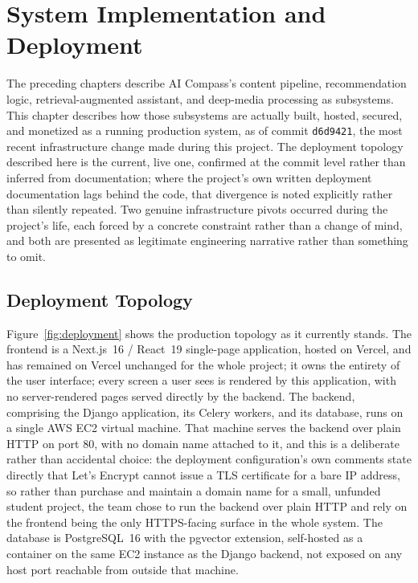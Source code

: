 \chapter{System Implementation and Deployment}
\label{chap:implementation}

The preceding chapters describe AI Compass's content pipeline, recommendation logic, retrieval-augmented assistant, and deep-media processing as subsystems. This chapter describes how those subsystems are actually built, hosted, secured, and monetized as a running production system, as of commit \texttt{d6d9421}, the most recent infrastructure change made during this project. The deployment topology described here is the current, live one, confirmed at the commit level rather than inferred from documentation; where the project's own written deployment documentation lags behind the code, that divergence is noted explicitly rather than silently repeated. Two genuine infrastructure pivots occurred during the project's life, each forced by a concrete constraint rather than a change of mind, and both are presented as legitimate engineering narrative rather than something to omit.

\section{Deployment Topology}
\label{sec:impl-topology}

Figure~\ref{fig:deployment} shows the production topology as it currently stands. The frontend is a Next.js~16 / React~19 single-page application, hosted on Vercel, and has remained on Vercel unchanged for the whole project; it owns the entirety of the user interface; every screen a user sees is rendered by this application, with no server-rendered pages served directly by the backend. The backend, comprising the Django application, its Celery workers, and its database, runs on a single AWS EC2 virtual machine. That machine serves the backend over plain HTTP on port 80, with no domain name attached to it, and this is a deliberate rather than accidental choice: the deployment configuration's own comments state directly that Let's Encrypt cannot issue a TLS certificate for a bare IP address, so rather than purchase and maintain a domain name for a small, unfunded student project, the team chose to run the backend over plain HTTP and rely on the frontend being the only HTTPS-facing surface in the whole system. The database is PostgreSQL~16 with the pgvector extension, self-hosted as a container on the same EC2 instance as the Django backend, not exposed on any host port reachable from outside that machine.


